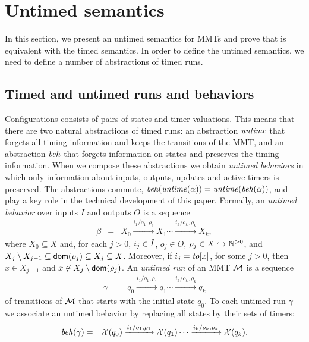 \section{Untimed semantics}
\label{section untimed semantics}
In this section, we present an untimed semantics for MMTs and prove that is equivalent with the timed semantics.
In order to define the untimed semantics, we need to define a number of abstractions of timed runs.

\subsection{Timed and untimed runs and behaviors}
Configurations consists of pairs of states and timer valuations. This means that there are two natural abstractions of
timed runs: an abstraction $\mathit{untime}$ that forgets all timing information and keeps the transitions of the MMT, 
and an abstraction $\mathit{beh}$ that forgets information on states and preserves the timing information.
When we compose these abstractions we obtain \emph{untimed behaviors} in which only information about inputs, outputs,
updates and active timers is preserved.
The abstractions commute, $\mathit{beh}(\mathit{untime}(\alpha))=\mathit{untime}(\mathit{beh}(\alpha))$, and play a key role in
the technical development of this paper.
%
Formally, an \emph{untimed behavior} over inputs $I$ and outputs $O$ is a sequence 
\begin{eqnarray*}
\beta & = & X_0 \xrightarrow{i_1/o_1, \rho_1} X_1  \cdots \xrightarrow{i_k/o_k, \rho_k} X_{k},
\end{eqnarray*}
where $X_0 \subseteq X$ and, for each $j>0$,  $i_j \in \hat{I}$, $o_j \in O$, $\rho_j \in X \hookrightarrow {\mathbb N}^{>0}$, and
 $X_j \setminus X_{j-1}  \subseteq {\textsf{dom}}(\rho_j) \subseteq X_j \subseteq X$.
Moreover, if $i_j = \mathit{to}[x]$, for some $j>0$, then $x \in X_{j-1}$ and $x \not\in X_j \setminus {\textsf{dom}}(\rho_j)$.
%
An \emph{untimed run} of an MMT ${\mathcal M}$ is a sequence
\begin{eqnarray*}
\gamma & = & q_0 \xrightarrow{i_1/o_1, \rho_1} q_1   \cdots \xrightarrow{i_k/o_k, \rho_k} q_k
\end{eqnarray*}
of transitions of ${\mathcal M}$ that starts with the initial state $q_0$. 
To each untimed run $\gamma$ we associate an untimed behavior by replacing all
states by their sets of timers:
\begin{eqnarray*}
\mathit{beh}(\gamma) & = & \mathcal{X}(q_0) \xrightarrow{i_1/o_1, \rho_1} \mathcal{X}(q_1)  \cdots \xrightarrow{i_k/o_k, \rho_k} \mathcal{X}(q_k).
\end{eqnarray*}
